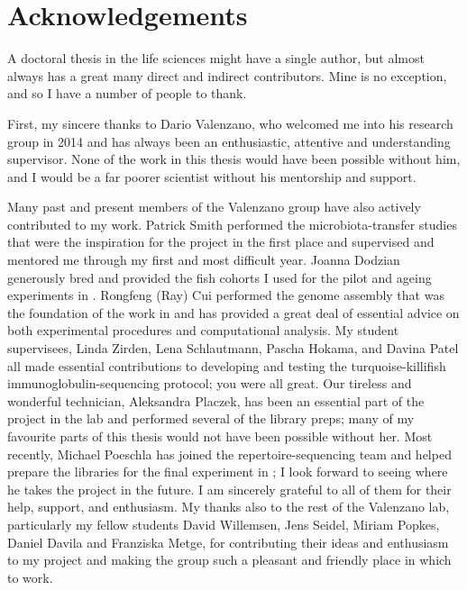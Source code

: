 {
\cleardoublepage
\setsinglecolumn
\chapter*{\centering \LARGE Acknowledgements}
\thispagestyle{empty}

A doctoral thesis in the life sciences might have a single author, but almost always has a great many direct and indirect contributors. Mine is no exception, and so I have a number of people to thank.

First, my sincere thanks to Dario Valenzano, who welcomed me into his research group in 2014 and has always been an enthusiastic, attentive and understanding supervisor. None of the work in this thesis would have been possible without him, and I would be a far poorer scientist without his mentorship and support.

Many past and present members of the Valenzano group have also actively contributed to my work. Patrick Smith performed the microbiota-transfer studies that were the inspiration for the project in the first place and supervised and mentored me through my first and most difficult year. Joanna Dodzian generously bred and provided the fish cohorts I used for the pilot and ageing experiments in . Rongfeng (Ray) Cui performed the genome assembly that was the foundation of the work in  and has provided a great deal of essential advice on both experimental procedures and computational analysis. My student supervisees, Linda Zirden, Lena Schlautmann, Pascha Hokama, and Davina Patel all made essential contributions to developing and testing the turquoise-killifish immunoglobulin-sequencing protocol; you were all great. Our tireless and wonderful technician, Aleksandra Placzek, has been an essential part of the \igseq project in the lab and performed several of the library preps; many of my favourite parts of this thesis would not have been possible without her. Most recently, Michael Poeschla has joined the repertoire-sequencing team and helped prepare the libraries for the final \igseq experiment in ; I look forward to seeing where he takes the project in the future. I am sincerely grateful to all of them for their help, support, and enthusiasm. My thanks also to the rest of the Valenzano lab, particularly my fellow students David Willemsen, Jens Seidel, Miriam Popkes, Daniel Davila and Franziska Metge, for contributing their ideas and enthusiasm to my project and making the group such a pleasant and friendly place in which to work.

}
